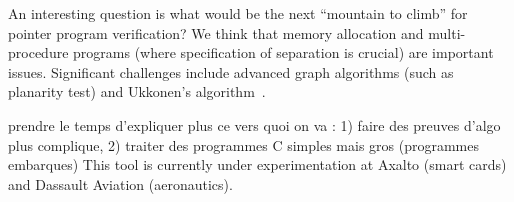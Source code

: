 An interesting question is what would be the next ``mountain to
climb'' for pointer program verification? We think that
memory allocation and multi-procedure programs (where specification of
separation is crucial) are important issues. Significant challenges
include advanced graph algorithms (such as planarity test) and
Ukkonen's algorithm~\cite{ukkonen95}.


{\Huge prendre le temps d'expliquer plus ce vers quoi on va : 1) faire
  des preuves d'algo plus complique, 2) traiter des programmes C
  simples mais gros (programmes embarques) }
This tool is currently under
experimentation at Axalto (smart cards) and Dassault Aviation
(aeronautics). 

